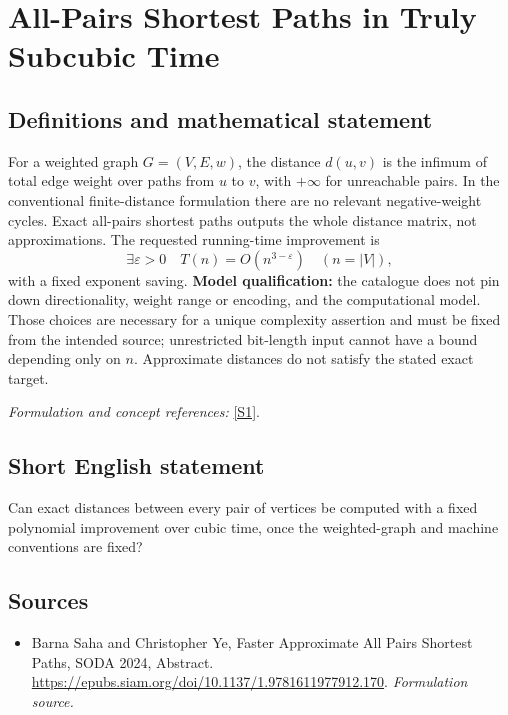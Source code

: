 \documentclass[11pt]{article}
\begin{document}
\section*{\texorpdfstring{All-Pairs Shortest Paths in Truly Subcubic Time}{All-Pairs Shortest Paths in Truly Subcubic Time}}\label{232}
\subsection{Definitions and mathematical statement}
For a weighted graph $G=(V,E,w)$, the distance $d(u,v)$ is the infimum of total edge weight over paths from $u$ to $v$, with $+\infty$ for unreachable pairs. In the conventional finite-distance formulation there are no relevant negative-weight cycles. Exact all-pairs shortest paths outputs the whole distance matrix, not approximations. The requested running-time improvement is
\[
 \exists{\varepsilon}>0\quad T(n)=O(n^{3-{\varepsilon}})\quad(n=|V|),
\]
with a fixed exponent saving. \textbf{Model qualification:} the catalogue does not pin down directionality, weight range or encoding, and the computational model. Those choices are necessary for a unique complexity assertion and must be fixed from the intended source; unrestricted bit-length input cannot have a bound depending only on $n$. Approximate distances do not satisfy the stated exact target.
\par\smallskip\textit{Formulation and concept references:} \href{https://epubs.siam.org/doi/10.1137/1.9781611977912.170}{[S1]}.

\subsection{Short English statement}
Can exact distances between every pair of vertices be computed with a fixed polynomial improvement over cubic time, once the weighted-graph and machine conventions are fixed?
\subsection{Sources}
\begin{itemize}
\item[S1]Barna Saha and Christopher Ye, Faster Approximate All Pairs Shortest Paths, SODA 2024, Abstract.
\url{https://epubs.siam.org/doi/10.1137/1.9781611977912.170}.
\textit{Formulation source.}
\end{itemize}
\end{document}
